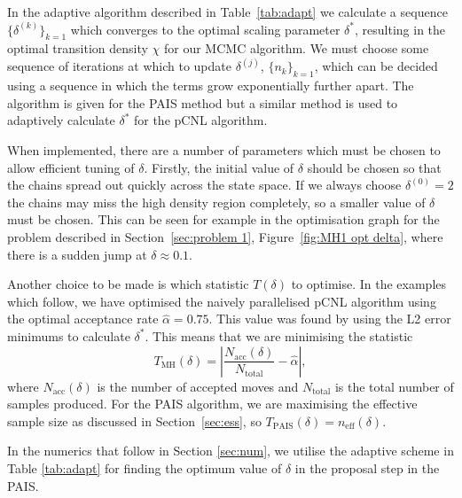 \documentclass[final]{siamltex}
\newcommand{\neff}{n_{\text{eff}}}
\begin{document}
In the adaptive algorithm described in Table~\ref{tab:adapt} we calculate a sequence $\{\delta^{(k)}\}_{k=1}$ which converges to the optimal scaling parameter $\delta^*$, resulting in the optimal transition density $\chi$ for our MCMC algorithm. We must choose some sequence of iterations at which to update $\delta^{(j)}$, $\{n_k\}_{k=1}$, which can be decided using a sequence in which the terms grow exponentially further apart. The algorithm is given for the PAIS method but a similar method is used to adaptively calculate $\delta^*$ for the pCNL algorithm.

When implemented, there are a number of parameters which must be chosen to allow efficient tuning of $\delta$. Firstly, the initial value of $\delta$ should be chosen so that the chains spread out quickly across the state space. If we always choose $\delta^{(0)}=2$ the chains may miss the high density region completely, so a smaller value of $\delta$ must be chosen. This can be seen for example in the optimisation graph for the problem described in Section~\ref{sec:problem 1}, Figure~\ref{fig:MH1 opt delta}, where there is a sudden jump at $\delta\approx 0.1$.

Another choice to be made is which statistic $T(\delta)$ to optimise. In the examples which follow, we have optimised the naively parallelised pCNL algorithm using the optimal acceptance rate $\hat{\alpha} = 0.75$. This value was found by using the L2 error minimums to calculate $\delta^*$. This means that we are minimising the statistic
\[
	T_{\text{MH}}(\delta) = \left| \frac{N_{\text{acc}}(\delta)}{N_{\text{total}}} - \hat{\alpha} \right|,
\]
where $N_{\text{acc}}(\delta)$ is the number of accepted moves and $N_{\text{total}}$ is the total number of samples produced. For the PAIS algorithm, we are maximising the effective sample size as discussed in Section~\ref{sec:ess}, so $T_{\text{PAIS}}(\delta) = \neff(\delta)$.

In the numerics that follow in Section \ref{sec:num}, we utilise the
adaptive scheme in Table \ref{tab:adapt} for finding the optimum value of $\delta$ in
the proposal step in the PAIS.
\end{document}
